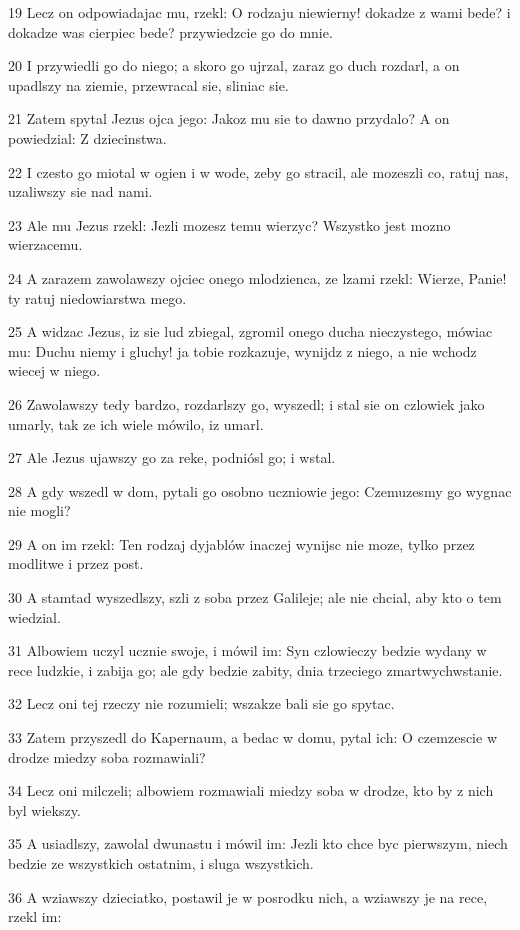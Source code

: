 \par 19 Lecz on odpowiadajac mu, rzekl: O rodzaju niewierny! dokadze z wami bede? i dokadze was cierpiec bede? przywiedzcie go do mnie.
\par 20 I przywiedli go do niego; a skoro go ujrzal, zaraz go duch rozdarl, a on upadlszy na ziemie, przewracal sie, sliniac sie.
\par 21 Zatem spytal Jezus ojca jego: Jakoz mu sie to dawno przydalo? A on powiedzial: Z dziecinstwa.
\par 22 I czesto go miotal w ogien i w wode, zeby go stracil, ale mozeszli co, ratuj nas, uzaliwszy sie nad nami.
\par 23 Ale mu Jezus rzekl: Jezli mozesz temu wierzyc? Wszystko jest mozno wierzacemu.
\par 24 A zarazem zawolawszy ojciec onego mlodzienca, ze lzami rzekl: Wierze, Panie! ty ratuj niedowiarstwa mego.
\par 25 A widzac Jezus, iz sie lud zbiegal, zgromil onego ducha nieczystego, mówiac mu: Duchu niemy i gluchy! ja tobie rozkazuje, wynijdz z niego, a nie wchodz wiecej w niego.
\par 26 Zawolawszy tedy bardzo, rozdarlszy go, wyszedl; i stal sie on czlowiek jako umarly, tak ze ich wiele mówilo, iz umarl.
\par 27 Ale Jezus ujawszy go za reke, podniósl go; i wstal.
\par 28 A gdy wszedl w dom, pytali go osobno uczniowie jego: Czemuzesmy go wygnac nie mogli?
\par 29 A on im rzekl: Ten rodzaj dyjablów inaczej wynijsc nie moze, tylko przez modlitwe i przez post.
\par 30 A stamtad wyszedlszy, szli z soba przez Galileje; ale nie chcial, aby kto o tem wiedzial.
\par 31 Albowiem uczyl ucznie swoje, i mówil im: Syn czlowieczy bedzie wydany w rece ludzkie, i zabija go; ale gdy bedzie zabity, dnia trzeciego zmartwychwstanie.
\par 32 Lecz oni tej rzeczy nie rozumieli; wszakze bali sie go spytac.
\par 33 Zatem przyszedl do Kapernaum, a bedac w domu, pytal ich: O czemzescie w drodze miedzy soba rozmawiali?
\par 34 Lecz oni milczeli; albowiem rozmawiali miedzy soba w drodze, kto by z nich byl wiekszy.
\par 35 A usiadlszy, zawolal dwunastu i mówil im: Jezli kto chce byc pierwszym, niech bedzie ze wszystkich ostatnim, i sluga wszystkich.
\par 36 A wziawszy dzieciatko, postawil je w posrodku nich, a wziawszy je na rece, rzekl im:
